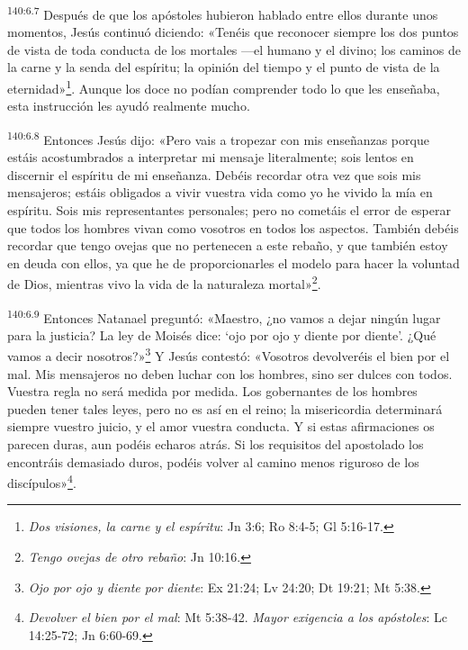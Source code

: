 \par 
\textsuperscript{140:6.7} Después de que los apóstoles hubieron hablado entre ellos durante unos momentos, Jesús continuó diciendo: «Tenéis que reconocer siempre los dos puntos de vista de toda conducta de los mortales ---el humano y el divino; los caminos de la carne y la senda del espíritu; la opinión del tiempo y el punto de vista de la eternidad»\footnote{\textit{Dos visiones, la carne y el espíritu}: Jn 3:6; Ro 8:4-5; Gl 5:16-17.}. Aunque los doce no podían comprender todo lo que les enseñaba, esta instrucción les ayudó realmente mucho.

\par 
\textsuperscript{140:6.8} Entonces Jesús dijo: «Pero vais a tropezar con mis enseñanzas porque estáis acostumbrados a interpretar mi mensaje literalmente; sois lentos en discernir el espíritu de mi enseñanza. Debéis recordar otra vez que sois mis mensajeros; estáis obligados a vivir vuestra vida como yo he vivido la mía en espíritu. Sois mis representantes personales; pero no cometáis el error de esperar que todos los hombres vivan como vosotros en todos los aspectos. También debéis recordar que tengo ovejas que no pertenecen a este rebaño, y que también estoy en deuda con ellos, ya que he de proporcionarles el modelo para hacer la voluntad de Dios, mientras vivo la vida de la naturaleza mortal»\footnote{\textit{Tengo ovejas de otro rebaño}: Jn 10:16.}.

\par 
\textsuperscript{140:6.9} Entonces Natanael preguntó: «Maestro, ¿no vamos a dejar ningún lugar para la justicia? La ley de Moisés dice: `ojo por ojo y diente por diente'. ¿Qué vamos a decir nosotros?»\footnote{\textit{Ojo por ojo y diente por diente}: Ex 21:24; Lv 24:20; Dt 19:21; Mt 5:38.} Y Jesús contestó: «Vosotros devolveréis el bien por el mal. Mis mensajeros no deben luchar con los hombres, sino ser dulces con todos. Vuestra regla no será medida por medida. Los gobernantes de los hombres pueden tener tales leyes, pero no es así en el reino; la misericordia determinará siempre vuestro juicio, y el amor vuestra conducta. Y si estas afirmaciones os parecen duras, aun podéis echaros atrás. Si los requisitos del apostolado los encontráis demasiado duros, podéis volver al camino menos riguroso de los discípulos»\footnote{\textit{Devolver el bien por el mal}: Mt 5:38-42. \textit{Mayor exigencia a los apóstoles}: Lc 14:25-72; Jn 6:60-69.}.

